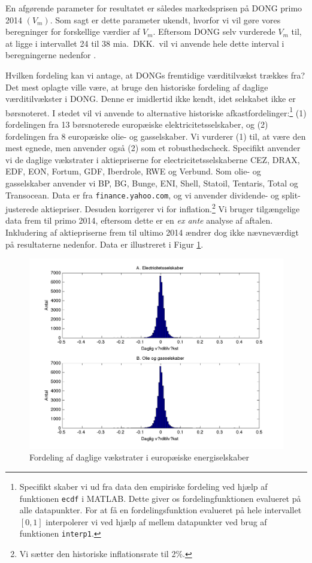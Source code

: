 \documentclass{article}
\begin{document}
En afgørende parameter for resultatet er således markedsprisen på DONG primo 2014 $(V_m)$. Som sagt er dette parameter ukendt, hvorfor vi vil gøre vores beregninger for forskellige værdier af $V_m$. Eftersom DONG selv vurderede $V_m$ til, at ligge i intervallet 24 til 38 mia.\ DKK.\ vil vi anvende hele dette interval i beregningerne nedenfor \citep{DONG2015b}.

Hvilken fordeling kan vi antage, at DONGs fremtidige værditilvækst trækkes fra? Det mest oplagte ville være, at bruge den historiske fordeling af daglige værditilvækster i DONG. Denne er imidlertid ikke kendt, idet selskabet ikke er børsnoteret. I stedet vil vi anvende to alternative historiske afkastfordelinger:\footnote{Specifikt skaber vi ud fra data den empiriske fordeling ved hjælp af funktionen \texttt{ecdf} i MATLAB. Dette giver os fordelingfunktionen evalueret på alle datapunkter. For at få en fordelingsfunktion evalueret på hele intervallet $[0,1]$ interpolerer vi ved hjælp af mellem datapunkter ved brug af funktionen \texttt{interp1}.} (1)  fordelingen fra 13 børsnoterede europæiske elektricitetsselskaber, og (2) fordelingen fra 8 europæiske olie- og gasselskaber. Vi vurderer (1) til, at være den mest egnede, men anvender også (2) som et robusthedscheck. Specifikt anvender vi de daglige vækstrater i aktiepriserne for electricitetsselskaberne CEZ, DRAX, EDF, EON, Fortum, GDF, Iberdrole, RWE og Verbund. Som olie- og gasselskaber anvender vi BP, BG, Bunge, ENI, Shell, Statoil, Tentaris, Total og Transocean. Data er fra \texttt{finance.yahoo.com}, og vi anvender dividende- og split-justerede aktiepriser. Desuden korrigerer vi for inflation.\footnote{Vi sætter den historiske inflationsrate til 2\%.} Vi bruger tilgængelige data frem til primo 2014, eftersom dette er en \emph{ex ante} analyse af aftalen. Inkludering af aktiepriserne frem til ultimo 2014 ændrer dog ikke nævneværdigt på resultaterne nedenfor. Data er illustreret i Figur \ref{fig:data_hist}.

\begin{figure}
\includegraphics[scale=0.8]{../matlab/figs/data_hist}
\caption{Fordeling af daglige v\ae{}kstrater i europ\ae{}iske energiselskaber}
\label{fig:data_hist}
\end{figure}
\end{document}
